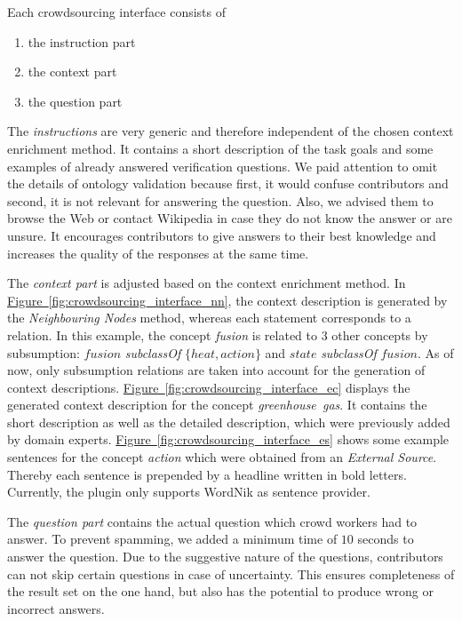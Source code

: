 Each crowdsourcing interface consists of
\begin{enumerate}
		\item the instruction part
		\item the context part
		\item the question part
\end{enumerate}

The \emph{instructions} are very generic and therefore independent of the chosen context enrichment method. It contains a short description of the task goals and some examples of already answered verification questions. We paid attention to omit the details of ontology validation because first, it would confuse contributors and second, it is not relevant for answering the question. Also, we advised them to browse the Web or contact Wikipedia in case they do not know the answer or are unsure. It encourages contributors to give answers to their best knowledge and increases the quality of the responses at the same time. 

The \emph{context part} is adjusted based on the context enrichment method.
In \hyperref[fig:crowdsourcing_interface_nn]{Figure~\ref*{fig:crowdsourcing_interface_nn}}, the context description is generated by the \emph{Neighbouring Nodes} method, whereas each statement corresponds to a relation. In this example, the concept \emph{fusion} is related to 3 other concepts by subsumption: $ fusion$  \emph{subclassOf} $ \{ heat, action \} $ and $ state $ \emph{subclassOf} $ fusion $. As of now, only subsumption relations are taken into account for the generation of context descriptions. 
\hyperref[fig:crowdsourcing_interface_ec]{Figure~\ref*{fig:crowdsourcing_interface_ec}} displays the generated context description for the concept \emph{greenhouse~gas}. It contains the short description as well as the detailed description, which were previously added by domain experts.
\hyperref[fig:crowdsourcing_interface_es]{Figure~\ref*{fig:crowdsourcing_interface_es}} shows some example sentences for the concept \emph{action} which were obtained from an \emph{External Source}. Thereby each sentence is prepended by a headline written in bold letters. Currently, the plugin only supports WordNik as sentence provider. 

The \emph{question part} contains the actual question which crowd workers had to answer. To prevent spamming, we added a minimum time of $10$ seconds to answer the question. Due to the suggestive nature of the questions, contributors can not skip certain questions in case of uncertainty. This ensures completeness of the result set on the one hand, but also has the potential to produce wrong or incorrect answers. 

